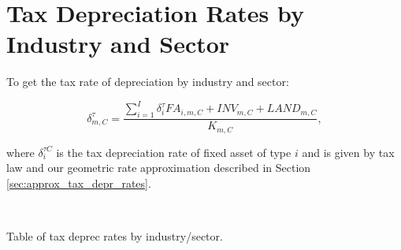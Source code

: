 \documentclass[article,11pt,letterpaper,fleqn]{article}
\theoremstyle{definition}
\numberwithin{equation}{section}
\begin{document}
\section{Tax Depreciation Rates by Industry and Sector}
\label{sec:tax_rates_sector}

 To get the tax rate of depreciation by industry and sector: 

\begin{equation}
\label{eqn:tax_deprec}
\delta^{\tau}_{m,C}=\frac{\sum_{i=1}^{I}\delta^{\tau}_{i}{FA}_{i,m,C}+{INV}_{m,C}+{LAND}_{m,C}}{K_{m,C}},
\end{equation}

\noindent\noindent where $\delta^{\tau C}_{i}$ is the tax depreciation rate of fixed asset of type $i$ and is given by tax law and our geometric rate approximation described in Section \ref{sec:approx_tax_depr_rates}.

\ \\
\begin{center}
Table of tax deprec rates by industry/sector.
\end{center}
\ \\



\end{document}

